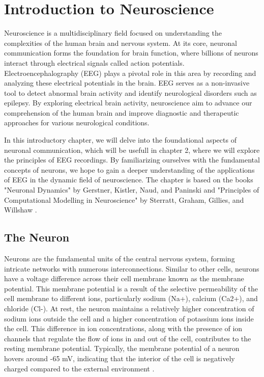 \documentclass[a4paper, UKenglish, 11pt]{uiomaster}
\begin{document}
\chapter{Introduction to Neuroscience}
Neuroscience is a multidisciplinary field focused on understanding the complexities of the human brain and nervous system. At its core, neuronal communication forms the foundation for brain function, where billions of neurons interact through electrical signals called action potentials. Electroencephalography (EEG) plays a pivotal role in this area by recording and analyzing these electrical potentials in the brain. EEG serves as a non-invasive tool to detect abnormal brain activity and identify neurological disorders such as epilepsy. By exploring electrical brain activity, neuroscience aim to advance our comprehension of the human brain and improve diagnostic and therapeutic approaches for various neurological conditions.

In this introductory chapter, we will delve into the foundational aspects of neuronal communication, which will be usefull in chapter 2, where we will explore the principles of EEG recordings. By familiarizing ourselves with the fundamental concepts of neurons, we hope to gain a deeper understanding of the applications of EEG in the dynamic field of neuroscience. The chapter is based on the books "Neuronal Dynamics" by Gerstner, Kistler, Naud, and Paninski \cite{gerstner2014neuronal} and "Principles of Computational Modelling in Neuroscience" by Sterratt, Graham, Gillies, and Willshaw \cite{sterratt2011principles}.



\section{The Neuron}

Neurons are the fundamental units of the central nervous system, forming intricate networks with numerous interconnections. Similar to other cells, neurons have a voltage difference across their cell membrane known as the membrane potential. This membrane potential is a result of the selective permeability of the cell membrane to different ions, particularly sodium (Na+), calcium (Ca2+), and chloride (Cl-). At rest, the neuron maintains a relatively higher concentration of sodium ions outside the cell and a higher concentration of potassium ions inside the cell. This difference in ion concentrations, along with the presence of ion channels that regulate the flow of ions in and out of the cell, contributes to the resting membrane potential. Typically, the membrane potential of a neuron hovers around -65 mV, indicating that the interior of the cell is negatively charged compared to the external environment \cite{sterratt2011principles}.
\end{document}
